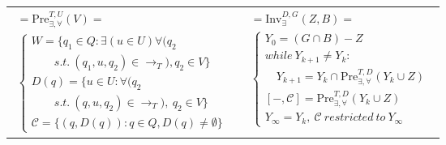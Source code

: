\begin{table}
\footnotesize
\begin{tabular}{ll}
	\begin{minipage}{.5\textwidth}
		\begin{align}
	[W,\mathcal{C}]=\text{Pre}_{\exists,\forall}^{T,U}(V)=\quad \quad \quad \quad \quad \quad \quad\quad\quad\quad\quad\nonumber\\
	\begin{cases}
	W = \{q_1\in Q: \exists (u\in U) \forall (q_2\\\quad\quad s.t.\ (q_1, u, q_2) \in \rightarrow_T), q_2\in V\}\\
	D(q)=\{u\in U: \forall (q_2\ \\
	\quad\quad s.t.\ (q,u,q_2)\in\rightarrow_{T}),\ q_2\in V\}\\
	\mathcal{C}=\{(q,D(q)):q\in Q,D(q)\not=\emptyset\}
	\end{cases}\label{eqn:pre}
	\end{align}
	\end{minipage}& 
\begin{minipage}{.5\textwidth}
\begin{align} [Y_{\infty},\mathcal{C}]=\text{Inv}_{\exists}^{D,G}(Z,B)=\ \quad \quad \quad \nonumber\\
\begin{cases}Y_0 = (G\cap B) - Z\\
while\ Y_{k+1}\not=Y_k:\\
\quad Y_{k+1} = Y_k\cap \text{Pre}_{\exists,\forall}^{T,D}(Y_k\cup Z)\\
[-,\mathcal{C}] = \text{Pre}^{T,D}_{\exists,\forall}(Y_k\cup Z)\\
Y_{\infty} = Y_k,\ \mathcal{C}\ restricted\ to\ Y_{\infty}
\end{cases} \label{win-inv} \end{align}
\end{minipage} 
\end{tabular} 
\end{table}

\iffalse	
\begin{algorithm}
	\small
	\caption{$ \text{PGPre}_{\exists,\forall}^{T} (Z,B) $}
	\label{alg:algorithm-label}
	\begin{algorithmic}
		\REQUIRE $ T, U, Z, B $\\
		\STATE $ Z_{\infty} = Z,\ \mathcal{V} = \{\},\ \mathcal{K}=\{\}, k = 1 $
		\FOR{$ U\in 2^U $} \FOR{$ G\in G(U) $}
		\STATE $ [V_k,\mathcal{C}_k]=Inv_{\exists}^{U,G}(Z_{\infty},B) $, $ Z_{\infty} = Z_{\infty} \cup V_k $, $ \mathcal{V}(k)=V_k,\ \mathcal{K}(k)=\mathcal{C}_k $, $ {\color{black} k = k+1} $
		\ENDFOR
		\ENDFOR
		\RETURN $ \mathcal{C} = (\mathcal{V},\mathcal{K},x) $
	\end{algorithmic}
	\label{alg: win-pgpre}
	\end{algorithm}
\fi


